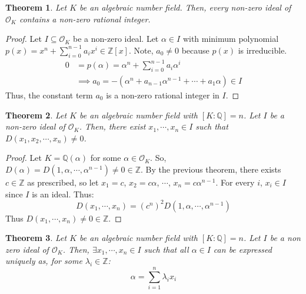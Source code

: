 \documentclass{article}
\newcommand{\air}{\mathcal{O}_K}
\newcommand{\Q}{\mathbb{Q}}
\newcommand{\Z}{\mathbb{Z}}
\newtheorem{theorem}{Theorem}[subsection]
\begin{document}
      \newpage
      \begin{theorem}
      Let $K$ be an algebraic number field. Then, every non-zero ideal of $\air$ contains a non-zero rational integer. 
      \end{theorem}
      \begin{proof}
      Let $I\subseteq \air$ be a non-zero ideal. Let $\alpha\in I$ with minimum polynomial $p(x)=x^n +\displaystyle\sum_{i=0}^{n-1}a_ix^i\in \Z[x]$. Note, $a_0\neq 0$ because $p(x)$ is irreducible. 
      \begin{align*}
          0 &= p(\alpha)=\alpha^n + \displaystyle\sum_{i=0}^{n-1}a_i\alpha^i\\
          &\implies a_0 = -(\alpha^n + a_{n-1}\alpha^{n-1}+\cdots +a_1\alpha)\in I
      \end{align*}
      Thus, the constant term $a_0$ is a non-zero rational integer in $I$.
      \end{proof}
      \begin{theorem}
      Let $K$ be an algebraic number field with $[K:\Q]=n$. Let $I$ be a non-zero ideal of $\air$. Then, there exist $x_1,\cdots, x_n\in I$ such that $D(x_1,x_2,\cdots, x_n)\neq 0$.  
      \end{theorem}
      \begin{proof}
      Let $K=\Q(\alpha)$ for some $\alpha\in\air$. So, $D(\alpha)=D(1,\alpha,\cdots, \alpha^{n-1})\neq 0 \in \Z$. By the previous theorem, there exists $c\in \Z$ as prescribed, so let $x_1=c$, $x_2=c\alpha$, $\cdots$, $x_n=c\alpha^{n-1}$. For every $i$, $x_i\in I$ since $I$ is an ideal. Thus:
      $$D(x_1,\cdots, x_n)=(c^n)^2 D(1,\alpha,\cdots, \alpha^{n-1})$$
      Thus $D(x_1,\cdots, x_n)\neq 0\in \Z$.
      \end{proof}
      \begin{theorem}
      Let $K$ be an algebraic number field with $[K:\Q]=n$. Let $I$ be a non zero ideal of $\air$. Then, $\exists x_1,\cdots, x_n\in I$ such that all $\alpha\in I$ can be expressed uniquely as, for some $\lambda_i\in \Z$:
      $$\alpha=\displaystyle\sum_{i=1}^n\lambda_ix_i$$
      \end{theorem}
\end{document}
